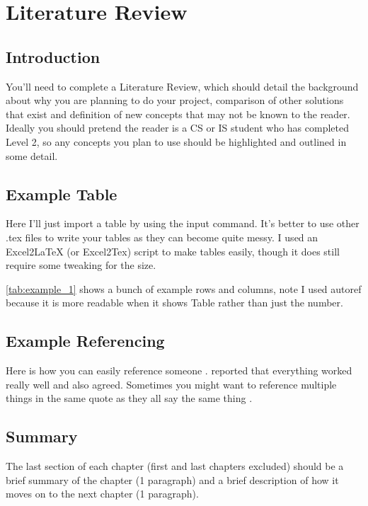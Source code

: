 \documentclass[final,a4paper,11pt]{report}
\begin{document}
\clearpage

\chapter{Literature Review}\label{chap:literature}
\section{Introduction}
You'll need to complete a Literature Review, which should detail the background about why you are planning to do your project, comparison of other solutions that exist and definition of new concepts that may not be known to the reader. Ideally you should pretend the reader is a CS or IS student who has completed Level 2, so any concepts you plan to use should be highlighted and outlined in some detail.

\section{Example Table}
Here I'll just import a table by using the input command. It's better to use other .tex files to write your tables as they can become quite messy. I used an Excel2LaTeX (or Excel2Tex) script to make tables easily, though it does still require some tweaking for the size.



\autoref{tab:example_1} shows a bunch of example rows and columns, note I used autoref because it is more readable when it shows Table rather than just the number.

\section{Example Referencing}
Here is how you can easily reference someone \citep{Smith2011}.  reported that everything worked really well and \citet{Johnson992} also agreed. Sometimes you might want to reference multiple things in the same quote as they all say the same thing \citep{LavinMera2008,Martin2007,RoyalSociety2010}.

\section{Summary}
The last section of each chapter (first and last chapters excluded) should be a brief summary of the chapter (1 paragraph) and a brief description of how it moves on to the next chapter (1 paragraph).
\end{document}
